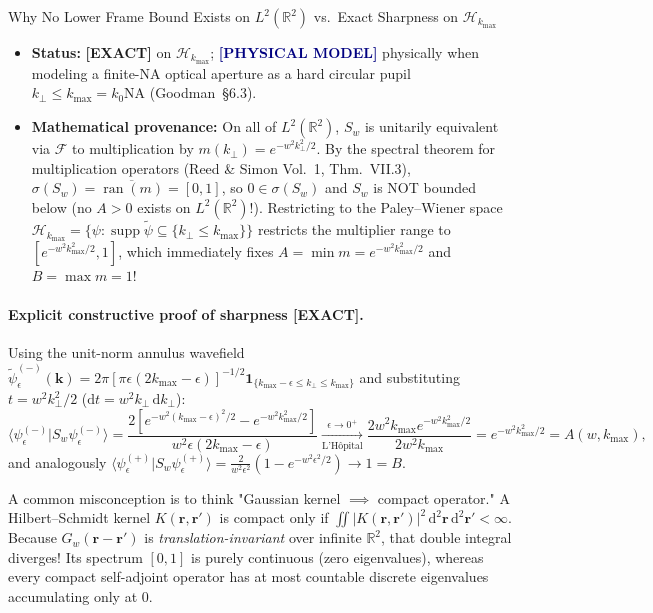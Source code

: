 \documentclass[10pt,letterpaper]{article}
\newcommand{\braket}[2]{\langle #1 | #2 \rangle}
\newcommand{\abs}[1]{\lvert #1 \rvert}
\newcommand{\dd}{\mathrm{d}}
\newcommand{\tagexact}{\textcolor{forest}{\textbf{[EXACT]}}}
\newcommand{\tagmodel}{\textcolor{navy}{\textbf{[PHYSICAL MODEL]}}}
\numberwithin{equation}{section}
\begin{document}
\begin{approxbox}{Why No Lower Frame Bound Exists on $L^2(\mathbb{R}^2)$ vs.\ Exact Sharpness on $\mathcal{H}_{k_{\max}}$}
\begin{itemize}[leftmargin=1.4em,itemsep=2pt,topsep=1pt]
  \item \textbf{Status:} \tagexact{} on $\mathcal{H}_{k_{\max}}$; \tagmodel{} physically when modeling a finite-NA optical aperture as a hard circular pupil $k_\perp \le k_{\max} = k_0\mathrm{NA}$ (Goodman~\S6.3).
  \item \textbf{Mathematical provenance:} On all of $L^2(\mathbb{R}^2)$, $S_w$ is unitarily equivalent via $\mathcal{F}$ to multiplication by $m(k_\perp) = e^{-w^2 k_\perp^2/2}$. By the spectral theorem for multiplication operators (Reed \& Simon Vol.~1, Thm.~VII.3), $\sigma(S_w) = \overline{\operatorname{ran}(m)} = [0,1]$, so $0 \in \sigma(S_w)$ and $S_w$ is NOT bounded below (no $A > 0$ exists on $L^2(\mathbb{R}^2)$!). Restricting to the Paley--Wiener space $\mathcal{H}_{k_{\max}} = \{\psi : \operatorname{supp}\widetilde{\psi} \subseteq \{k_\perp \le k_{\max}\}\}$ restricts the multiplier range to $[e^{-w^2 k_{\max}^2/2}, 1]$, which immediately fixes $A = \min m = e^{-w^2 k_{\max}^2/2}$ and $B = \max m = 1$!
\end{itemize}
\end{approxbox}

\paragraph*{Explicit constructive proof of sharpness \tagexact{}.}
Using the unit-norm annulus wavefield $\widetilde{\psi}_\epsilon^{(-)}(\mathbf{k}) = 2\pi[\pi\epsilon(2k_{\max}-\epsilon)]^{-1/2}\allowbreak\mathbf{1}_{\{k_{\max}-\epsilon \le k_\perp \le k_{\max}\}}$ and substituting $t = w^2 k_\perp^2/2$ ($\dd t = w^2 k_\perp\,\dd k_\perp$):
\begin{equation}
  \braket{\psi_\epsilon^{(-)}}{S_w\psi_\epsilon^{(-)}} = \frac{2\left[e^{-w^2(k_{\max}-\epsilon)^2/2} - e^{-w^2 k_{\max}^2/2}\right]}{w^2\epsilon(2k_{\max}-\epsilon)} \xrightarrow[\text{L'H\^opital}]{\epsilon\to 0^+} \frac{2 w^2 k_{\max} e^{-w^2 k_{\max}^2/2}}{2 w^2 k_{\max}} = e^{-w^2 k_{\max}^2/2} = A(w, k_{\max}),
\end{equation}
and analogously $\braket{\psi_\epsilon^{(+)}}{S_w\psi_\epsilon^{(+)}} = \frac{2}{w^2\epsilon^2}(1 - e^{-w^2\epsilon^2/2}) \to 1 = B$.

\begin{learnbox}
A common misconception is to think "Gaussian kernel $\implies$ compact operator." A Hilbert--Schmidt kernel $K(\mathbf{r},\mathbf{r}')$ is compact only if $\iint \abs{K(\mathbf{r},\mathbf{r}')}^2\,\dd^2\mathbf{r}\,\dd^2\mathbf{r}' < \infty$. Because $G_w(\mathbf{r}-\mathbf{r}')$ is \emph{translation-invariant} over infinite $\mathbb{R}^2$, that double integral diverges! Its spectrum $[0,1]$ is purely continuous (zero eigenvalues), whereas every compact self-adjoint operator has at most countable discrete eigenvalues accumulating only at $0$.
\end{learnbox}
\end{document}
